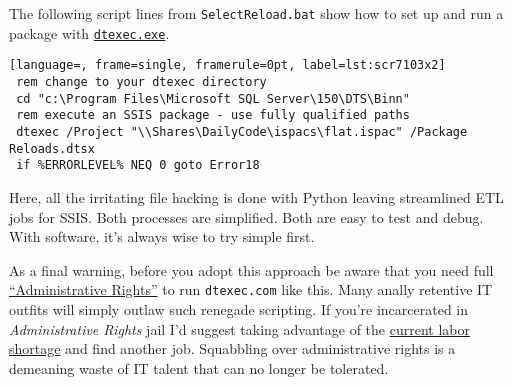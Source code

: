 The following script lines from \texttt{SelectReload.bat} show how to
set up and run a package with
\href{https://docs.microsoft.com/en-us/sql/integration-services/packages/dtexec-utility?view=sql-server-ver15}{\texttt{dtexec.exe}}.


\begin{tcolorbox}[breakable, size=fbox, boxrule=1pt, pad at break*=1mm,colback=cellbackground, colframe=cellborder]
\begin{lstlisting}[language=, frame=single, framerule=0pt, label=lst:scr7103x2]
 rem change to your dtexec directory
 cd "c:\Program Files\Microsoft SQL Server\150\DTS\Binn"
 rem execute an SSIS package - use fully qualified paths
 dtexec /Project "\\Shares\DailyCode\ispacs\flat.ispac" /Package Reloads.dtsx
 if %ERRORLEVEL% NEQ 0 goto Error18
\end{lstlisting}
\end{tcolorbox}


Here, all the irritating file hacking is done with Python leaving
streamlined ETL jobs for SSIS. Both processes are simplified. Both are
easy to test and debug. With software, it's always wise to try simple
first.

As a final warning, before you adopt this approach be aware that you
need full
\href{https://www.makeuseof.com/tag/windows-admin-rights/}{``Administrative
Rights''} to run \texttt{dtexec.com} like this. Many anally retentive IT
outfits will simply outlaw such renegade scripting. If you're
incarcerated in \emph{Administrative Rights} jail I'd suggest taking
advantage of the
\href{https://inthesetimes.com/article/labor-shortage-jobs-report-low-wages-biden-covid}{current
labor shortage} and find another job. Squabbling over administrative
rights is a demeaning waste of IT talent that can no longer be
tolerated.

%

